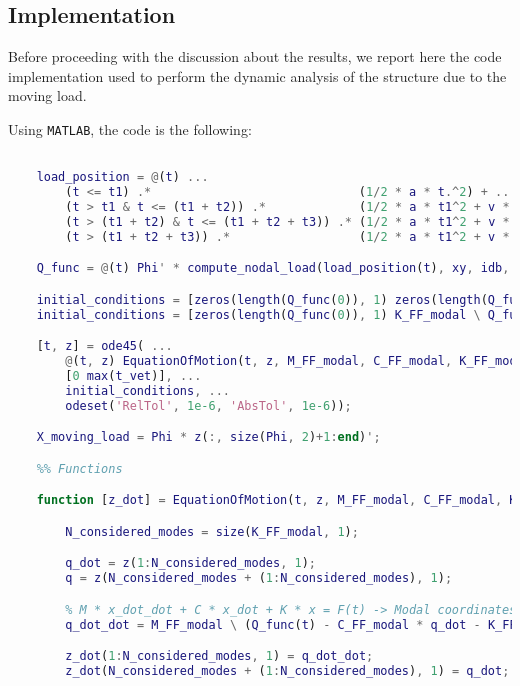 \subsection{Implementation}
\label{subsec:implementation}

Before proceeding with the discussion about the results, we report here the code implementation used to perform the dynamic analysis of the structure due to the moving load.

Using \texttt{MATLAB}, the code is the following:

\begin{lstlisting}[language=Matlab]

    load_position = @(t) ...
        (t <= t1) .*                             (1/2 * a * t.^2) + ...
        (t > t1 & t <= (t1 + t2)) .*             (1/2 * a * t1^2 + v * (t - t1)) + ...
        (t > (t1 + t2) & t <= (t1 + t2 + t3)) .* (1/2 * a * t1^2 + v * t2 + v * (t - (t2 + t1)) - 1/2 * a * (t - (t1 + t2)).^2) + ...
        (t > (t1 + t2 + t3)) .*                  (1/2 * a * t1^2 + v * t2 + v * t3 - 1/2 * a * t3.^2);

    Q_func = @(t) Phi' * compute_nodal_load(load_position(t), xy, idb, -9.81 * 40e3);

    initial_conditions = [zeros(length(Q_func(0)), 1) zeros(length(Q_func(0)), 1)];
    initial_conditions = [zeros(length(Q_func(0)), 1) K_FF_modal \ Q_func(0)];

    [t, z] = ode45( ...
        @(t, z) EquationOfMotion(t, z, M_FF_modal, C_FF_modal, K_FF_modal, Q_func), ...
        [0 max(t_vet)], ...
        initial_conditions, ...
        odeset('RelTol', 1e-6, 'AbsTol', 1e-6));

    X_moving_load = Phi * z(:, size(Phi, 2)+1:end)';

    %% Functions

    function [z_dot] = EquationOfMotion(t, z, M_FF_modal, C_FF_modal, K_FF_modal, Q_func)

        N_considered_modes = size(K_FF_modal, 1);

        q_dot = z(1:N_considered_modes, 1);
        q = z(N_considered_modes + (1:N_considered_modes), 1);

        % M * x_dot_dot + C * x_dot + K * x = F(t) -> Modal coordinates -> q
        q_dot_dot = M_FF_modal \ (Q_func(t) - C_FF_modal * q_dot - K_FF_modal * q);

        z_dot(1:N_considered_modes, 1) = q_dot_dot;
        z_dot(N_considered_modes + (1:N_considered_modes), 1) = q_dot;


\end{lstlisting}
